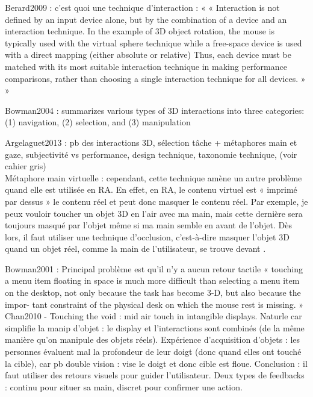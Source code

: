 Berard2009 : c'est quoi une technique d'interaction : « « Interaction is not defined by an input device alone, but by the combination of a device and an interaction technique. In the example of 3D object rotation, the mouse is typically used with the virtual sphere technique while a free-space device is used with a direct mapping (either absolute or relative) Thus, each device must be matched with its most suitable interaction technique in making performance comparisons, rather than choosing a single interaction technique for all devices. » »

Bowman2004 : summarizes various types of 3D interactions into three categories: (1) navigation, (2) selection, and (3)
manipulation

Argelaguet2013 : pb des interactions 3D, sélection tâche + métaphores main et gaze, subjectivité vs performance, design technique, taxonomie technique,  (voir cahier gris)\\
Métaphore main virtuelle : cependant, cette technique amène un autre problème quand elle est utilisée en RA. En effet, en RA, le contenu virtuel est « imprimé par dessus » le contenu réel et peut donc masquer le contenu réel. Par exemple, je peux vouloir toucher un objet 3D en l'air avec ma main, mais cette dernière sera toujours masqué par l'objet même si ma main semble en avant de l'objet. Dès lors, il faut utiliser une technique d'occlusion, c'est-à-dire masquer l'objet 3D quand un objet réel, comme la main de l'utilisateur, se trouve devant .


Bowman2001 : Principal problème est qu'il n'y a aucun retour tactile « touching a menu item floating in space is much more difficult than selecting a menu item on the desktop, not only because the task has become 3-D, but also because the impor- tant constraint of the physical desk on which the mouse rest is missing. »\\
Chan2010 - Touching the void : mid air touch in intangible displays. Naturle car simplifie la manip d'objet : le display et l'interactions sont combinés (de la même manière qu'on manipule des objets réels). Expérience d'acquisition d'objets : les personnes évaluent mal la profondeur de leur doigt (donc quand elles ont touché la cible), car pb double vision : vise le doigt et donc cible est floue. Conclusion : il faut utiliser des retours visuels pour guider l'utilisateur. Deux types de feedbacks : continu pour situer sa main, discret pour confirmer une action.

